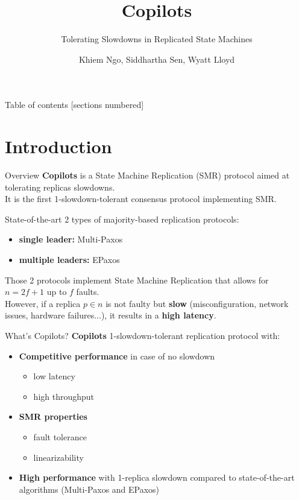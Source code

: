 \documentclass[10pt]{beamer}
\title{Copilots}
\subtitle{Tolerating Slowdowns in Replicated State
Machines}
\date{}
\author{Khiem Ngo, Siddhartha Sen, Wyatt Lloyd}
\institute{Princeton University, Microsoft Research - Presented at OSDI '20}
\begin{document}
\maketitle

\begin{frame}{Table of contents}
  [sections numbered]
  \tableofcontents%
\end{frame}

\section[Introduction]{Introduction}

\begin{frame}[fragile]{Overview}
\textbf{Copilots} is a State Machine Replication (SMR) protocol aimed at tolerating replicas slowdowns. \\
\smallbreak
It is the first 1-slowdown-tolerant consensus protocol implementing SMR.
\end{frame}


\begin{frame}[fragile]{State-of-the-art}
2 types of majority-based replication protocols: 
\begin{itemize}
    \item \textbf{single leader:} Multi-Paxos
    \item \textbf{multiple leaders:} EPaxos
\end{itemize}
Those 2 protocols implement State Machine Replication that allows for $n=2f+1$ up to $f$ faults. \\
\smallbreak
However, if a replica $p \in n$ is not faulty but \textbf{slow} (misconfiguration, network issues, hardware failures...), it results in a \textbf{high latency}.
\end{frame}


\begin{frame}[fragile]{What's Copilots?}
 \textbf{Copilots} 1-slowdown-tolerant replication protocol with: 
 \begin{itemize}
     \item  \textbf{Competitive performance} in case of no slowdown
     \begin{itemize}
         \item low latency
         \item high throughput
     \end{itemize}
     \item \textbf{SMR properties}
     \begin{itemize}
         \item fault tolerance
         \item linearizability
     \end{itemize}
     \item \textbf{High performance} with 1-replica slowdown compared to state-of-the-art algorithms (Multi-Paxos and EPaxos)
 \end{itemize}

\end{frame}
\end{document}
